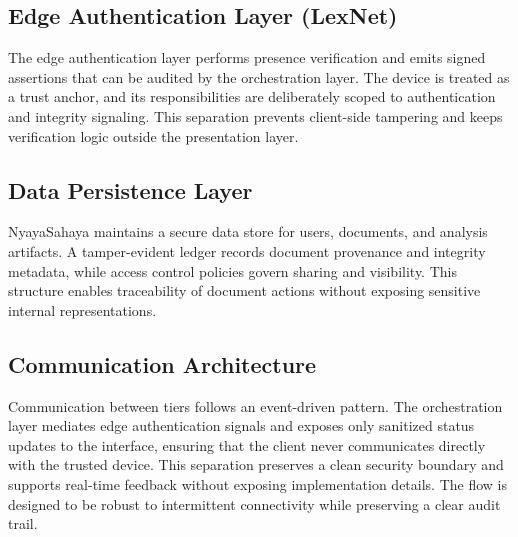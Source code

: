 \subsection{Edge Authentication Layer (LexNet)}

The edge authentication layer performs presence verification and emits signed assertions that can be audited by the orchestration layer. The device is treated as a trust anchor, and its responsibilities are deliberately scoped to authentication and integrity signaling. This separation prevents client-side tampering and keeps verification logic outside the presentation layer.

\subsection{Data Persistence Layer}

NyayaSahaya maintains a secure data store for users, documents, and analysis artifacts. A tamper-evident ledger records document provenance and integrity metadata, while access control policies govern sharing and visibility. This structure enables traceability of document actions without exposing sensitive internal representations.

\subsection{Communication Architecture}

Communication between tiers follows an event-driven pattern. The orchestration layer mediates edge authentication signals and exposes only sanitized status updates to the interface, ensuring that the client never communicates directly with the trusted device. This separation preserves a clean security boundary and supports real-time feedback without exposing implementation details. The flow is designed to be robust to intermittent connectivity while preserving a clear audit trail.
